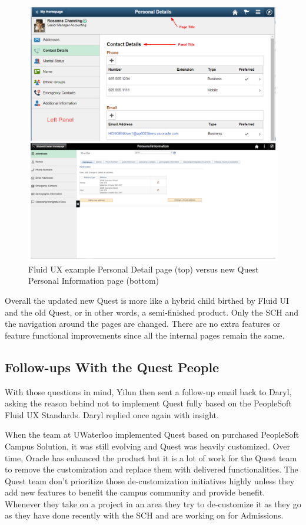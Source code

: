 \documentclass[conference]{IEEEtran}
\begin{document}
\begin{figure}[htdp]
\centering
  \includegraphics[width=1\columnwidth]{Personal_detail.png}
  \caption{Fluid UX example Personal Detail page (top) versus new Quest Personal Information page (bottom) \cite{b7}}
  \label{fig:figure6}
\end{figure}


Overall the updated new Quest is more like a hybrid child birthed by Fluid UI and the old Quest, or in other words, a semi-finished product. Only the SCH and the navigation around the pages are changed. There are no extra features or feature functional improvements since all the internal pages remain the same.

\subsection{Follow-ups With the Quest People}
With those questions in mind, Yilun then sent a follow-up email back to Daryl, asking the reason behind not to implement Quest fully based on the PeopleSoft Fluid UX Standards. Daryl replied once again with insight.

When the team at UWaterloo implemented Quest based on purchased PeopleSoft Campus Solution, it was still evolving and Quest was heavily customized.  Over time, Oracle has enhanced the product but it is a lot of work for the Quest team to remove the customization and replace them with delivered functionalities. The Quest team don't prioritize those de-customization initiatives highly unless they add new features to benefit the campus community and provide benefit.  Whenever they take on a project in an area they try to de-customize it as they go as they have done recently with the SCH and are working on for Admissions.
 
\end{document}
